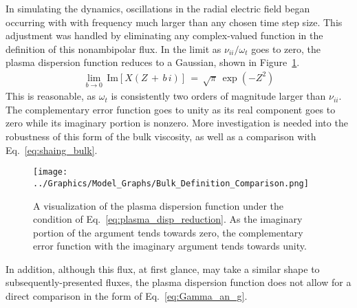 In simulating the dynamics, oscillations in the radial electric field began occurring with with frequency much larger than any chosen time step size.
This adjustment was handled by eliminating any complex-valued function in the definition of this nonambipolar flux.
In the limit as $\nu_{ii} / \omega_t$ goes to zero, the plasma dispersion function reduces to a Gaussian, shown in Figure~\ref{fig:bulk_definition_comparison}.
\begin{align} %
	\lim_{b \to 0} \, \text{Im}\left[X(Z \,+\, b\,i)\right] \,=\, \sqrt{\pi} \,
		\exp(-Z^2) \label{eq:plasma_disp_reduction}
\end{align}
This is reasonable, as $\omega_t$ is consistently two orders of magnitude larger than $\nu_{ii}$.
The complementary error function goes to unity as its real component goes to zero while its imaginary portion is nonzero.
More investigation is needed into the robustness of this form of the bulk viscosity, as well as a comparison with Eq.~\ref{eq:shaing_bulk}.

\begin{figure}[tb] %
	\centering
	\texttt{[image: ../Graphics/Model\_Graphs/Bulk\_Definition\_Comparison.png]}
	\caption{A visualization of the plasma dispersion function under the condition of Eq.~\ref{eq:plasma_disp_reduction}.
	As the imaginary portion of the argument tends towards zero, the complementary error function with the imaginary argument tends towards unity.}
	\label{fig:bulk_definition_comparison}
\end{figure}

In addition, although this flux, at first glance, may take a similar shape to subsequently-presented fluxes, the plasma dispersion function does not allow for a direct comparison in the form of Eq.~\ref{eq:Gamma_an_g}.


